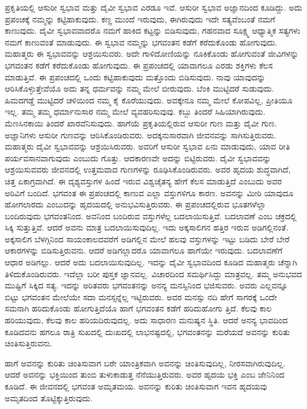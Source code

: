 ಪ್ರಕೃತಿಯಲ್ಲಿ ಆಸುರೀ ಸ್ವಭಾವ ಮತ್ತು ದೈವೀ ಸ್ವಭಾವ ಎರಡೂ ಇವೆ. ಆಸುರೀ ಸ್ವಭಾವ ಅಜ್ಞಾನದಿಂದ ಕೂಡಿದ್ದು. ಅದು ಪ್ರಪಂಚಕ್ಕೆ ನಮ್ಮನ್ನು ಕಟ್ಟಿಹಾಕುವುದು. ಕಣ್ಣ ಮುಂದೆ ಇರುವುದು, ಈಗಿರುವುದು ಇದೇ ಸತ್ಯವೆಂಬಂತೆ ನಮಗೆ ಕಾಣುವುದು. ದೈವೀ ಸ್ವಭಾವವಾದರೊ ನಮಗೆ ಹಾಕಿದ ಕಟ್ಟನ್ನು ಬಿಡಿಸುವುದು, ಗಹನವಾದ ಸೂಕ್ಷ್ಮ ಆಧ್ಯಾತ್ಮಿಕ ಸತ್ಯಗಳು ನಮಗೆ ಕಾಣುವಂತೆ ಮಾಡುವುದು. ಈ ಸ್ವಭಾವ ನಮ್ಮನ್ನು ಭಗವಂತನ ಕಡೆಗೆ ಕರೆದುಕೊಂಡು ಹೋಗುವುದು. ಮಹಾತ್ಮರು ಈ ಸ್ವಭಾವವನ್ನು ಆಶ್ರಯಿಸುವರು. ಅದೇ ಗಾಳಿದೋಣಿಯನ್ನು ನೂಕಿಕೊಂಡು ಹೋಗುವಂತೆ ಜೀವಿಗಳನ್ನು ಭಗವಂತನ ಕಡೆಗೆ ಕರೆದುಕೊಂಡು ಹೋಗುವುದು. ಈ ಪ್ರಪಂಚದಲ್ಲಿ ಯಾವಾಗಲೂ ಎರಡು ಶಕ್ತಿಗಳು ಕೆಲಸ ಮಾಡುತ್ತಿವೆ. ಈ ಪ್ರಪಂಚದಲ್ಲಿ ಒಂದು ಕಟ್ಟಿಹಾಕುವುದು ಮತ್ತೊಂದು ಬಿಡಿಸುವುದು. ನಾವು ಯಾವುದನ್ನು ಆರಿಸಿಕೊಳ್ಳುತ್ತೇವೆಯೊ ಅದು ತನ್ನ ಧರ್ಮವನ್ನು ನಮ್ಮ ಮೇಲೆ ಬೀರುವುದು. ಬೆಂಕಿ ಮುಟ್ಟಿದರೆ ಸುಡುವುದು. ಹಿಮದಗಡ್ಡೆ ಮುಟ್ಟಿದರೆ ಚಳಿಯಿಂದ ನಮ್ಮ ಕೈ ಕೊರೆಯುವುದು. ಅವಕ್ಕೇನೂ ನಮ್ಮ ಮೇಲೆ ಕೋಪವಿಲ್ಲ, ಪ್ರೀತಿಯೂ ಇಲ್ಲ. ತಮ್ಮ ತಮ್ಮ ಧರ್ಮಾನುಸಾರ ನಮ್ಮ ಮೇಲೆ ವ್ಯವಹರಿಸುವುವು. ಕಬ್ಬು ತಿಂದರೆ ಸಿಹಿಯಾಗಿರುವುದು. ಮೆಣಸಿನಕಾಯಿ ತಿಂದರೆ ಖಾರವೆನಿಸುವುದು. ಹಾಗೆಯೆ ಪ್ರಕೃತಿಯಲ್ಲಿರುವ ಆಸುರೀ ಗುಣ ಮತ್ತು ದೈವೀ ಗುಣ. ಅಜ್ಞಾನಿಗಳು ಆಸುರೀ ಗುಣವನ್ನು ಆರಿಸಿಕೊಂಡಿರುವರು. ಅದಕ್ಕನುಸಾರವಾಗಿ ಜೀವನವನ್ನು ಸಾಗಿಸುತ್ತಿರುವರು. ಮಹಾತ್ಮರು ದೈವೀ ಸ್ವಭಾವವನ್ನು ಆಶ್ರಯಿಸಿರುವರು. ಅವರಿಗೆ ಆಸುರೀ ಸ್ವಭಾವ ಏನು ಮಾಡುವುದು, ಯಾವ ರೀತಿ ಪರ್ಯವಸಾನವಾಗುವುದು ಎಂಬುದು ಗೊತ್ತು. ಆದಕಾರಣವೇ ಅದನ್ನು ಬಿಟ್ಟಿರುವರು. ದೈವೀ ಸ್ವಭಾವವನ್ನು ಆಶ್ರಯಿಸುವವರು ಜೀವನದಲ್ಲಿ ಉತ್ತಮವಾದ ಗುಣಗಳನ್ನು ರೂಢಿಸಿಕೊಂಡಿರುವರು. ಅವರ ಹೃದಯ ಶುದ್ಧವಾಗಿದೆ, ಚಿತ್ತ ಏಕಾಗ್ರವಾಗಿದೆ. ಈ ದೃಶ್ಯವಸ್ತುಗಳ ಹಿಂದೆ ಇರುವ ವಿಶ್ವಚೈತನ್ಯ ಹೇಗೆ ಕೆಲಸ ಮಾಡುತ್ತಿದೆ ಎಂಬುದು ಅವರ ಅರಿವಿಗೆ ಬಂದಿದೆ. ಭಗವಂತ ಈ ಪ್ರಪಂಚದಲ್ಲಿ ಕಾಣುವ ಎಲ್ಲಾ ವಸ್ತುಗಳಿಗೂ ಕಾರಣ. ಅವನನ್ನು ಮೀರಿ ಯಾವುದೂ ಹೋಗಲಾರದು ಎಂಬುದನ್ನು ಹೃದಯದಲ್ಲಿ ಅನುಭವಿಸುತ್ತಿರುವರು. ಈ ಪ್ರಪಂಚದಲ್ಲಿರುವ ಭೂತಗಳೆಲ್ಲಾ ಬಂದಿರುವುದು ಭಗವಂತನಿಂದ. ಅವನಿಂದ ಬಂದಿರುವ ವಸ್ತುಗಳೆಲ್ಲ ಬದಲಾಯಿಸುತ್ತಿವೆ. ಬದಲಾವಣೆ ಎಂಬ ಚಕ್ರದಲ್ಲಿ ಸಿಕ್ಕಿ ಸುತ್ತುತ್ತಿವೆ. ಆದರೆ ಅವನು ಮಾತ್ರ ಬದಲಾಯಿಸುವುದಿಲ್ಲ. ಇದು ಅಕ್ಕಸಾಲಿಗನ ಹತ್ತಿರ ಇರುವ ಅಡಿಗಲ್ಲಿನಂತೆ. ಅಕ್ಕಸಾಲಿಗ ಬೆಳಗ್ಗಿನಿಂದ ಸಾಯಂಕಾಲದವರೆಗೆ ಅಡಿಗಲ್ಲಿನ ಮೇಲೆ ಹಲವು ವಸ್ತುಗಳನ್ನು ಇಟ್ಟು ಬಡಿದು ಬೇರೆ ಬೇರೆ ಆಕಾರಗಳನ್ನು ಬಿಡಿಸುತ್ತಿರುವನು. ಆದರೆ ಅಡಿಗಲ್ಲಾದರೊ ಯಾವಾಗಲೂ ಹಾಗೆಯೇ ಇರುವುದು. ಬದಲಾವಣೆಗೆ ಆಧಾರ ಅಡಿಗಲ್ಲು. ಆದರೆ ಅದು ಬದಲಾಯಿಸುವುದಿಲ್ಲ. ಇದನ್ನು ದೈವೀ ಸ್ವಭಾವದಿಂದ ಕೂಡಿದ ಮಹಾತ್ಮರು ಚೆನ್ನಾಗಿ ತಿಳಿದುಕೊಂಡಿರುವರು. ಇದೆಲ್ಲಾ ಬರೀ ಪುಸ್ತಕ ಜ್ಞಾನವಲ್ಲ. ವಿಚಾರದಿಂದ ಸಮರ್ಥಿಸಿದ್ದು ಮಾತ್ರವಲ್ಲ. ತಮ್ಮ ಅನುಭವದ ಮುಷ್ಟಿಗೆ ಸಿಕ್ಕಿದ ಸತ್ಯ. ಇದನ್ನು ಅರಿತವರು ಭಗವಂತನನ್ನು ಅನನ್ಯ ಮನಸ್ಸಿನಿಂದ ಭಜಿಸುವರು. ಅವರು ಎಲ್ಲವನ್ನೂ ಬಿಟ್ಟು ಭಗವಂತನ ಮೇಲೆಯೇ ಸದಾ ಮನಸ್ಸನ್ನೆಲ್ಲ ಇಟ್ಟಿರುವರು. ಅವರ ಮನಸ್ಸು ನದಿ ಹೇಗೆ ಸಾಗರಕ್ಕೆ ಒಂದೇ ಸಮನಾಗಿ ಹರಿದುಕೊಂಡು ಹೋಗುತ್ತಿದೆಯೊ ಹಾಗೆ ಭಗವಂತನ ಕಡೆಗೆ ಹರಿದುಹೋಗು ತ್ತಿದೆ. ಕೆಲವು ಕಾಲ ಹರಿಯುವುದು, ಕೆಲವು ಕಾಲ ಹರಿಯದಿರುವುದಲ್ಲ. ಅದು ಸಾಧಾರಣ ಮನುಷ್ಯನ ಸ್ಥಿತಿ. ಆದರೆ ಅನನ್ಯ ಭಾವದಿಂದ ಕೂಡಿದವನು ಹಗಲೂ ರಾತ್ರಿ ಸುಖದಲ್ಲಿ ದುಃಖದಲ್ಲಿ ಲಾಭನಷ್ಟದಲ್ಲಿ, ಭಗವಂತನನ್ನು ಮರೆಯದೆ ಅವನನ್ನು ಕುರಿತು ಚಿಂತಿಸುತ್ತಿರುವನು.

ಹಾಗೆ ಅವನನ್ನು ಕುರಿತು ಚಿಂತಿಸುವಾಗ ಬರೇ ಯಾಂತ್ರಿಕವಾಗಿ ಅವನನ್ನು ಚಿಂತಿಸುವುದಿಲ್ಲ, ನೀರಸವಾಗಿರುವುದಿಲ್ಲ. ಆದರೆ ಅವನನ್ನು ಭಕ್ತಿಯಿಂದ ತುಂಬಿ ತುಳುಕಾಡುತ್ತ ನೆನೆಯುತ್ತಿರುವರು. ಅವರ ಹೃದಯ ಭಕ್ತಿ ಎಂಬ ಜೇನಿನಿಂದ ಕೂಡಿದೆ. ಈ ಜೀವನದಲ್ಲಿ ಭಗವಂತ ಅಮೃತಮಯ. ಅವನನ್ನು ಕುರಿತು ಚಿಂತಿಸುವಾಗ ಇವನ ಹೃದಯವು ಅಮೃತದಿಂದ ತೊಟ್ಟಿಕ್ಕುತ್ತಿರುವುದು.

